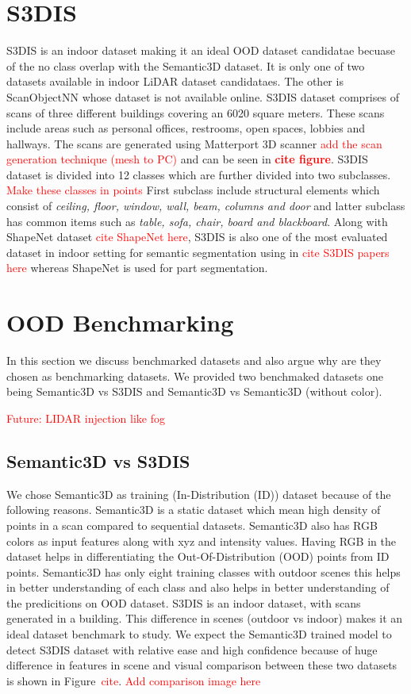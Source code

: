 \section{S3DIS}
S3DIS is an indoor dataset making it an ideal OOD dataset candidatae becuase of the no class overlap with the Semantic3D dataset.
It is only one of two datasets available in indoor LiDAR dataset candidataes. 
The other is ScanObjectNN whose dataset is not available online.
S3DIS dataset comprises of scans of three different buildings covering an 6020 square meters.
These scans include areas such as personal offices, restrooms, open spaces, lobbies and hallways.
The scans are generated using Matterport 3D scanner \textcolor{red}{add the scan generation technique (mesh to PC)} and can be seen in \textcolor{red}{\textbf{cite figure}}.
S3DIS dataset is divided into 12 classes which are further divided into two subclasses.
\textcolor{red}{Make these classes in points}
First subclass include structural elements which consist of \textit{ceiling, floor, window, wall, beam, columns and door}
and latter subclass has common items such as \textit{table, sofa, chair, board and blackboard}.
Along with ShapeNet dataset \textcolor{red}{cite ShapeNet here}, S3DIS is also one of the most evaluated dataset in indoor setting for semantic segmentation  using in \textcolor{red}{cite S3DIS papers here} whereas ShapeNet is used for part segmentation.

\section{OOD Benchmarking}
In this section we discuss benchmarked datasets and also argue why are they chosen as benchmarking datasets.
We provided two benchmaked datasets one being Semantic3D vs S3DIS and Semantic3D vs Semantic3D (without color).

\textcolor{red}{Future: LIDAR injection like fog}
\subsection{Semantic3D vs S3DIS}
We chose Semantic3D as training (In-Distribution (ID)) dataset because of the following reasons.
Semantic3D is a static dataset which mean high density of points in a scan compared to sequential datasets.
Semantic3D also has RGB colors as input features along with xyz and intensity values.
Having RGB in the dataset helps in differentiating the Out-Of-Distribution (OOD) points from ID points.
Semantic3D has only eight training classes with outdoor scenes this helps in better understanding of each class and also helps in better understanding of the predicitions on OOD dataset.
S3DIS is an indoor dataset, with scans generated in a building.
This difference in scenes (outdoor vs indoor) makes it an ideal dataset benchmark to study.
We expect the Semantic3D trained model to detect S3DIS dataset with relative ease and high confidence because of huge difference in features in scene and visual comparison between these two datasets is shown in Figure~\textcolor{red}{cite}.
\textcolor{red}{Add comparison image here}

